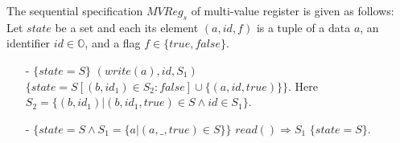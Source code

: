

\begin{example}
\label{definition:sequential specification of multi-value register}
The sequential specification $\mathit{MVReg}_s$ of multi-value register is given as follows: Let $\mathit{state}$ be a set and each its element $(a,\mathit{id},f)$ is a tuple of a data $a$, an identifier $\mathit{id} \in \mathbb{O}$, and a flag $f \in \{ \mathit{true},\mathit{false} \}$.
\begin{itemize}
\setlength{\itemsep}{0.5pt}
\item[-] $\{ \mathit{state} = S \}$ $(write(a),\mathit{id},S_1)$ $\{ \mathit{state} = S[(b,\mathit{id}_1) \in S_2 : \mathit{false}]
\cup
\{ (a,id,\mathit{true}) \}
\}$. Here $S_2 = \{ (b,\mathit{id}_1) \vert (b,\mathit{id}_1,\mathit{true}) \in S \wedge id \in S_1 \}$.
\item[-] $\{ \mathit{state} = S \wedge S_1 = \{ a \vert (a,\_,\mathit{true}) \in S \} \}$ $read() \Rightarrow S_1$ $\{ \mathit{state} = S \}$.
\end{itemize}
\end{example}




